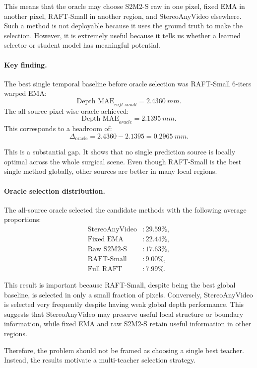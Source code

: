 \documentclass[11pt,a4paper]{article}
\begin{document}
This means that the oracle may choose S2M2-S raw in one pixel, fixed EMA in another pixel, RAFT-Small in another region, and StereoAnyVideo elsewhere. Such a method is not deployable because it uses the ground truth to make the selection. However, it is extremely useful because it tells us whether a learned selector or student model has meaningful potential.

\paragraph{Key finding.}
The best single temporal baseline before oracle selection was RAFT-Small 6-iters warped EMA:
\[
\text{Depth MAE}_{raft\text{-}small}
=
\SI{2.4360}{mm}.
\]
The all-source pixel-wise oracle achieved:
\[
\text{Depth MAE}_{oracle}
=
\SI{2.1395}{mm}.
\]
This corresponds to a headroom of:
\[
\Delta_{\text{oracle}}
=
2.4360 - 2.1395
=
\SI{0.2965}{mm}.
\]

This is a substantial gap. It shows that no single prediction source is locally optimal across the whole surgical scene. Even though RAFT-Small is the best single method globally, other sources are better in many local regions.

\paragraph{Oracle selection distribution.}
The all-source oracle selected the candidate methods with the following average proportions:
\[
\begin{aligned}
\text{StereoAnyVideo} &: 29.59\%,\\
\text{Fixed EMA} &: 22.44\%,\\
\text{Raw S2M2-S} &: 17.63\%,\\
\text{RAFT-Small} &: 9.00\%,\\
\text{Full RAFT} &: 7.99\%.
\end{aligned}
\]

This result is important because RAFT-Small, despite being the best global baseline, is selected in only a small fraction of pixels. Conversely, StereoAnyVideo is selected very frequently despite having weak global depth performance. This suggests that StereoAnyVideo may preserve useful local structure or boundary information, while fixed EMA and raw S2M2-S retain useful information in other regions.

Therefore, the problem should not be framed as choosing a single best teacher. Instead, the results motivate a multi-teacher selection strategy.
\end{document}
